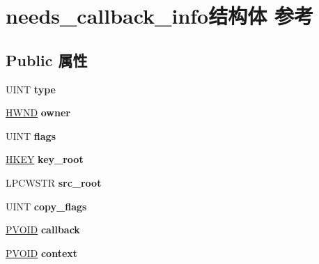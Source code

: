 \hypertarget{structneeds__callback__info}{}\section{needs\+\_\+callback\+\_\+info结构体 参考}
\label{structneeds__callback__info}
\subsection*{Public 属性}
\begin{DoxyCompactItemize}
\item 
\mbox{\label{structneeds__callback__info_a10d179e2ba6301552e6b5f36070ef879}} 
U\+I\+NT {\bfseries type}
\item 
\mbox{\label{structneeds__callback__info_a4e14285afef338c44c53124e024ba7bc}} 
\hyperlink{interfacevoid}{H\+W\+ND} {\bfseries owner}
\item 
\mbox{\label{structneeds__callback__info_a8347e917a8bb83ef21304a35c45341d8}} 
U\+I\+NT {\bfseries flags}
\item 
\mbox{\label{structneeds__callback__info_a60e001a8571e2f964df9f549ee87a310}} 
\hyperlink{interfacevoid}{H\+K\+EY} {\bfseries key\+\_\+root}
\item 
\mbox{\label{structneeds__callback__info_a2f250d6db25a9f74c3b37c64c42cc920}} 
L\+P\+C\+W\+S\+TR {\bfseries src\+\_\+root}
\item 
\mbox{\label{structneeds__callback__info_ad709ad99e50ed185139e4864ccd1eadb}} 
U\+I\+NT {\bfseries copy\+\_\+flags}
\item 
\mbox{\label{structneeds__callback__info_ade8c3a3e3a64d28ab90524162a0f427f}} 
\hyperlink{interfacevoid}{P\+V\+O\+ID} {\bfseries callback}
\item 
\mbox{\label{structneeds__callback__info_a70294568e4029de9e7135989729be370}} 
\hyperlink{interfacevoid}{P\+V\+O\+ID} {\bfseries context}
\item 

\end{DoxyCompactItemize}
